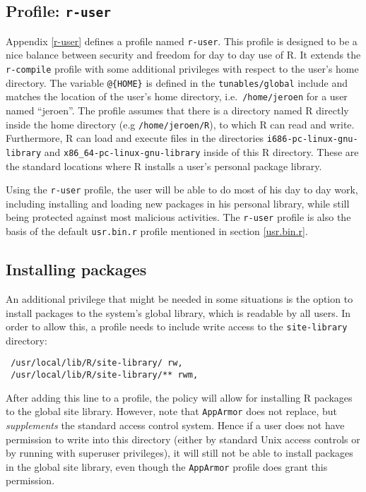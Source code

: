 \documentclass[article]{jss}
\newcommand{\R}{\textsf{R}\xspace}
\newcommand{\AppArmor}{\texttt{AppArmor}\xspace}
\begin{document}
\subsection[Profile: r-user]{Profile: \texttt{r-user}}

Appendix \ref{r-user} defines a profile named \texttt{r-user}. This profile is
designed to be a nice balance between security and freedom for day to day use of
R. It extends the \texttt{r-compile} profile with some additional privileges
with respect to the user's home directory. The variable \texttt{@\{HOME\}} is
defined in the \texttt{tunables/global} include and matches the location of the
user's home directory, i.e.\ \texttt{/home/jeroen} for a user named ``jeroen''.
The profile assumes that there is a directory named \R directly inside
the home directory (e.g \texttt{/home/jeroen/R}), to which \R can read and
write. Furthermore, \R can load and execute files in the directories
\texttt{i686-pc-linux-gnu-library} and \texttt{x86\_64-pc-linux-gnu-library}
inside of this \R directory. These are the standard locations where
\R installs a user's personal package library.

Using the \texttt{r-user} profile, the user will be able to do most of his day
to day work, including installing and loading new packages in his personal
library, while still being protected against most malicious activities. The
\texttt{r-user} profile is also the basis of the default \texttt{usr.bin.r}
profile mentioned in section \ref{usr.bin.r}.

\subsection{Installing packages}

An additional privilege that might be needed in some situations is the option to
install packages to the system's global library, which is readable by all
users. In order to allow this, a profile needs to include write access to the
\texttt{site-library} directory:

\begin{verbatim}
 /usr/local/lib/R/site-library/ rw,
 /usr/local/lib/R/site-library/** rwm,
\end{verbatim}

After adding this line to a profile, the policy will allow for installing R
packages to the global site library. However, note that \AppArmor does not
replace, but \emph{supplements} the standard access control system. Hence if a
user does not have permission to write into this directory (either by
standard Unix access controls or by running with superuser privileges), it will
still not be able to install packages in the global site library, even though
the \AppArmor profile does grant this permission.
\end{document}
